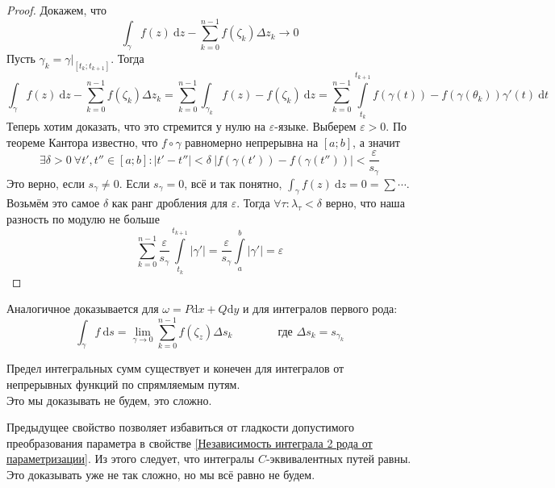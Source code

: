 \documentclass{article}
\begin{document}
    \begin{proof}
        Докажем, что
        $$
        \int_\gamma f(z)~\mathrm dz-\sum\limits_{k=0}^{n-1}f(\zeta_k)\Delta z_k\longrightarrow0
        $$
        Пусть $\gamma_k=\gamma\big|_{[t_k;t_{k+1}]}$. Тогда
        $$
        \int_\gamma f(z)~\mathrm dz-\sum\limits_{k=0}^{n-1}f(\zeta_k)\Delta z_k=\sum\limits_{k=0}^{n-1}\int_{\gamma_k}f(z)-f(\zeta_k)~\mathrm dz=
        \sum\limits_{k=0}^{n-1}\int\limits_{t_k}^{t_{k+1}}f(\gamma(t))-f(\gamma(\theta_k))\gamma'(t)~\mathrm dt
        $$
        Теперь хотим доказать, что это стремится у нулю на $\varepsilon$-языке. Выберем $\varepsilon>0$. По теореме Кантора известно, что $f\circ\gamma$ равномерно непрерывна на $[a;b]$, а значит
        $$
        \exists\delta>0~\forall t',t''\in[a;b]:|t'-t''|<\delta~|f(\gamma(t'))-f(\gamma(t''))|<\frac\varepsilon{s_\gamma}
        $$
        Это верно, если $s_\gamma\neq0$. Если $s_\gamma=0$, всё и так понятно, $\int_\gamma f(z)~\mathrm dz=0=\sum\cdots$.\\
        Возьмём это самое $\delta$ как ранг дробления для $\varepsilon$. Тогда $\forall\tau:\lambda_\tau<\delta$ верно, что наша разность по модулю не больше
        $$
        \sum\limits_{k=0}^{n-1}\frac\varepsilon{s_\gamma}\int\limits_{t_k}^{t_{k+1}}|\gamma'|=\frac\varepsilon{s_\gamma}\int\limits_a^b|\gamma'|=\varepsilon
        $$
    \end{proof}
    \begin{remark}
        Аналогичное доказывается для $\omega=P\mathrm dx+Q\mathrm dy$ и для интегралов первого рода:
        $$
        \int_\gamma f~\mathrm ds=\lim\limits_{\gamma\to0}\sum\limits_{k=0}^{n-1}f(\zeta_z)\Delta s_k\qquad\qquad\text{где }\Delta s_k=s_{\gamma_k}
        $$
    \end{remark}
    \begin{remark}
        Предел интегральных сумм существует и конечен для интегралов от непрерывных функций по спрямляемым путям.\\
        Это мы доказывать не будем, это сложно.
    \end{remark}
    \begin{remark}
        Предыдущее свойство позволяет избавиться от гладкости допустимого преобразования параметра в свойстве \ref{Независимость интеграла 2 рода от параметризации}. Из этого следует, что интегралы $C$-эквивалентных путей равны.\\
        Это доказывать уже не так сложно, но мы всё равно не будем.
    \end{remark}
\end{document}
